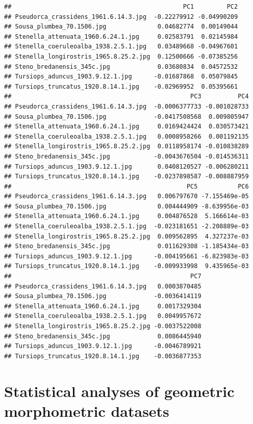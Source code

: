 \documentclass[]{book}
\theoremstyle{definition}
\theoremstyle{definition}
\theoremstyle{definition}
\theoremstyle{remark}
\begin{document}
\begin{verbatim}
##                                               PC1         PC2
## Pseudorca_crassidens_1961.6.14.3.jpg  -0.22279912 -0.04990209
## Sousa_plumbea_70.1506.jpg              0.04682774  0.00149044
## Stenella_attenuata_1960.6.24.1.jpg     0.02583791  0.02145984
## Stenella_coeruleoalba_1938.2.5.1.jpg   0.03489668 -0.04967601
## Stenella_longirostris_1965.8.25.2.jpg  0.12500666 -0.07385256
## Steno_bredanensis_345c.jpg             0.03680834  0.04572532
## Tursiops_aduncus_1903.9.12.1.jpg      -0.01687868  0.05079845
## Tursiops_truncatus_1920.8.14.1.jpg    -0.02969952  0.05395661
##                                                 PC3          PC4
## Pseudorca_crassidens_1961.6.14.3.jpg  -0.0006377733 -0.001028733
## Sousa_plumbea_70.1506.jpg             -0.0417508568  0.009805947
## Stenella_attenuata_1960.6.24.1.jpg     0.0169424424  0.030573421
## Stenella_coeruleoalba_1938.2.5.1.jpg   0.0008958266  0.001192135
## Stenella_longirostris_1965.8.25.2.jpg  0.0118958174 -0.010838289
## Steno_bredanensis_345c.jpg            -0.0043676504 -0.014536311
## Tursiops_aduncus_1903.9.12.1.jpg       0.0408120527 -0.006280211
## Tursiops_truncatus_1920.8.14.1.jpg    -0.0237898587 -0.008887959
##                                                PC5           PC6
## Pseudorca_crassidens_1961.6.14.3.jpg   0.006797670 -7.155469e-05
## Sousa_plumbea_70.1506.jpg              0.004444909 -8.639956e-03
## Stenella_attenuata_1960.6.24.1.jpg     0.004876528  5.166614e-03
## Stenella_coeruleoalba_1938.2.5.1.jpg  -0.023181651 -2.208889e-03
## Stenella_longirostris_1965.8.25.2.jpg  0.009562895  4.327237e-03
## Steno_bredanensis_345c.jpg             0.011629308 -1.185434e-03
## Tursiops_aduncus_1903.9.12.1.jpg      -0.004195661 -6.823983e-03
## Tursiops_truncatus_1920.8.14.1.jpg    -0.009933998  9.435965e-03
##                                                 PC7
## Pseudorca_crassidens_1961.6.14.3.jpg   0.0003870485
## Sousa_plumbea_70.1506.jpg             -0.0036414119
## Stenella_attenuata_1960.6.24.1.jpg     0.0017329304
## Stenella_coeruleoalba_1938.2.5.1.jpg   0.0049957672
## Stenella_longirostris_1965.8.25.2.jpg -0.0037522008
## Steno_bredanensis_345c.jpg             0.0086445940
## Tursiops_aduncus_1903.9.12.1.jpg      -0.0046789921
## Tursiops_truncatus_1920.8.14.1.jpg    -0.0036877353
\end{verbatim}

\section{Statistical analyses of geometric morphometric
datasets}\label{statistical-analyses-of-geometric-morphometric-datasets}
\end{document}
